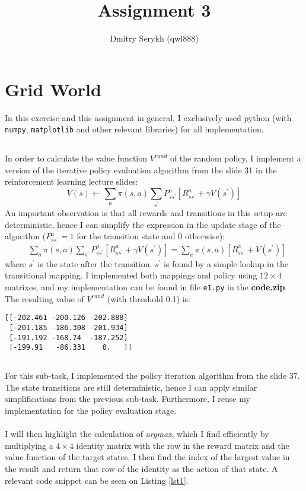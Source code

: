 \documentclass[a4paper]{article}
\title{\vspace{-5cm} Assignment 3}
\author{Dmitry Serykh (qwl888)}
\begin{document}
\maketitle

\section{Grid World}
\label{sec:1}
In this exercise and this assignment in general, I exclusively used python (with
\texttt{numpy}, \texttt{matplotlib} and other relevant libraries) for all
implementation.
\subsection{}
\label{subsec:11}
In order to calculate the value function $V^{rand}$ of the random policy, I
implement a version of the iterative policy evaluation algorithm from the slide
31 in the reinforcement learning lecture slides:
$$
  V(s) \leftarrow \sum_{a} \pi(s, a)
  \sum_{s^{\prime}} P_{s s^{\prime}}^{a}\left[R_{s s^{\prime}}^{a}+\gamma
    V(s^{\prime})\right]
  $$
An important observation is that all rewards and
transitions in this setup are deterministic, hence I can simplify the expression in the update
stage of the algorithm ($P_{s s^{\prime}}^{a} = 1$ for the transition state and
0 otherwise):
\begin{align*}
  &\sum_{a} \pi(s, a) \sum_{s^{\prime}} P_{s s^{\prime}}^{a}\left[R_{s s^{\prime}}^{a}+\gamma
    V(s^{\prime})\right] = 
  \sum_{a} \pi(s, a)
  \left[R_{s s^{\prime}}^{a} + V(s^{\prime})\right]
\end{align*}
where $s^{\prime}$ is the state after the transition. $s^{\prime}$ is found
by a simple lookup in the transitional mapping. I implemented both mappings and policy
using $12\times 4$ matrixes, and my implementation can be found in file \texttt{e1.py} in the
\textbf{code.zip}. The resulting value of $V^{rand}$ (with threshold 0.1) is:
\begin{verbatim}
[[-202.461 -200.126 -202.888]
 [-201.185 -186.308 -201.934]
 [-191.192 -168.74  -187.252]
 [-199.91   -86.331    0.   ]]
\end{verbatim}

\subsection{}
\label{subsec:12}
For this sub-task, I implemented the policy iteration algorithm
from the slide 37. The state transitions are still deterministic, hence I can
apply similar simplifications from the previous sub-task. Furthermore, I reuse
my implementation for the policy evaluation stage. \\\\
I will then highlight the calculation of \emph{argmax}, which I find
efficiently by multiplying a $4 \times 4$ identity matrix with the row in the
reward matrix and the value function of the target states. I then find the index
of the largest value in the result and return that row of the identity as the
action of that state.
A relevant code snippet can be seen on Listing \ref{lst1}.
\end{document}
